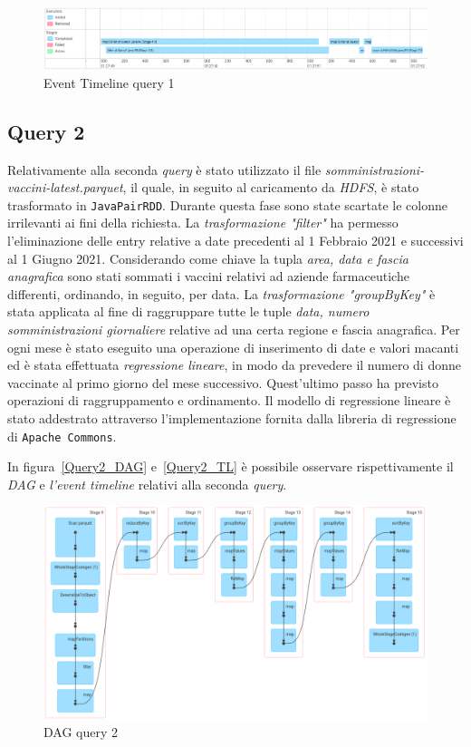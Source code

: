\documentclass[conference]{IEEEtran}
\begin{document}
\begin{figure}[htbp]
\includegraphics[scale=0.165]{Screenshot/Query1_timeline.png}
\caption{Event Timeline query 1}\label{Query1_TL}
\label{fig}
\end{figure}

\subsection*{\textbf{Query 2}}
Relativamente alla seconda \emph{query} \`{e} stato utilizzato il file \textit{somministrazioni-vaccini-latest.parquet}, il quale, in seguito al caricamento da \emph{HDFS}, \`{e} stato trasformato in \texttt{JavaPairRDD}. Durante questa fase sono state scartate le colonne irrilevanti ai fini della richiesta. La \emph{trasformazione "filter"} ha permesso l'eliminazione delle entry relative a date precedenti al 1 Febbraio 2021 e successivi al 1 Giugno 2021. Considerando come chiave la tupla \emph{area, data e fascia anagrafica} sono stati sommati i vaccini relativi ad aziende farmaceutiche differenti, ordinando, in seguito, per data. La \emph{trasformazione "groupByKey"} \`{e} stata applicata al fine di raggruppare tutte le tuple \emph{data, numero somministrazioni giornaliere} relative ad una certa regione e fascia anagrafica. Per ogni mese \`{e} stato eseguito una operazione di inserimento di date e valori macanti ed \`{e} stata effettuata \emph{regressione lineare}, in modo da prevedere il numero di donne vaccinate al primo giorno del mese successivo. Quest'ultimo passo ha previsto operazioni di raggruppamento e ordinamento. Il modello di regressione lineare \`{e} stato addestrato attraverso l'implementazione fornita dalla libreria di regressione di \texttt{Apache Commons}.
\par In figura~\ref{Query2_DAG} e~\ref{Query2_TL} \`{e} possibile osservare rispettivamente il \emph{DAG} e \emph{l'event timeline} relativi alla seconda \emph{query}. 
\begin{figure}[htbp]
\includegraphics[scale=0.19]{Screenshot/Query2_DAG.png}
\caption{DAG query 2}\label{Query2_DAG}
\label{fig}
\end{figure}
\end{document}
